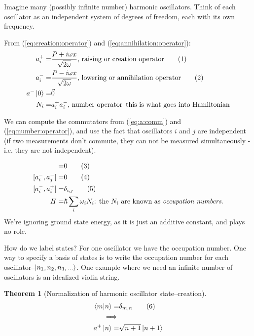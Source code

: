 \documentclass[]{article}
\newcommand\numberthis{\addtocounter{equation}{1}\tag{\theequation}}
\newtheorem{thm}{Theorem}
\begin{document}
Imagine many (possibly infinite number) harmonic oscillators. Think of each oscillator  as an independent system of degrees of freedom, each with its own frequency.

From (\ref{eq:creation:operator}) and (\ref{eq:annihilation:operator}):
\begin{align*}
	a^+_i = & \frac{P + i \omega x } {\sqrt{2 \omega}} \text{, raising or creation operator} \numberthis \label{eq:creation:operator:i}\\
	a^-_i = & \frac{P - i \omega x } {\sqrt{2 \omega}}\text{, lowering or annihilation operator} \numberthis \label{eq:annihilation:operator_i}\\
	a^-\ket{0} =& \vec{0}\\
	N_i=& a^+_i a^-_i \text{, number operator--this is what goes into Hamiltonian} 
\end{align*}

 We can compute the commutators from  (\ref{eq:a:comm}) and (\ref{eq:number:operator}), and use the fact that oscillators $i$ and $j$ are independent (if two measurements don't commute, they can not be measured simultaneously - i.e. they are not independent). 

\begin{align*}
	[a^+_i,a^+_j] =& 0 \numberthis \label{eq:a:comm_i_plus}\\
	[a^-_i,a^-_j] =& 0 \numberthis \label{eq:a:comm_i_minus}\\
	[a^-_i,a^+_i] =& \delta_{i,j} \numberthis \label{eq:a:comm_i}\\
	H =& \hslash \sum_{i}  \omega_i N_i\text{: the $N_i$ are known as \emph{occupation numbers}.}
\end{align*}
We're ignoring ground state energy, as it is just an additive constant, and plays no role.

How do we label states? For one oscillator we have the occupation number. One way to specify a basis of states is to write the occupation number for each oscillator--$\ket{n_1,n_2,n_3,...}$. One example where we need an infinite number of oscillators is an idealized violin string.

\begin{thm}[Normalization of harmonic oscillator state--creation]\label{thm:norm:harmonic}
	\begin{align*}
		\braket{m|n}=&\delta_{m,n} \numberthis \label{eq:norm}\\
		\implies&\\
		a^+\ket{n}=&\sqrt{n+1}\ket{n+1}
	\end{align*}
\end{thm} 
\end{document}
